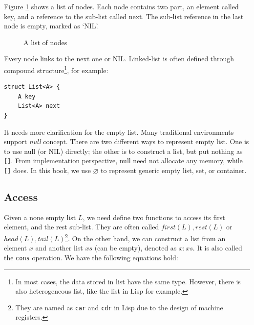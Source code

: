 \documentclass[b5paper]{article}
\begin{document}
Figure \ref{fig:list-example} shows a list of nodes. Each node contains two part, an element called key, and a reference to the sub-list called next. The sub-list reference in the last node is empty, marked as `NIL'.

\begin{figure}[htbp]
  \centering
  \caption{A list of nodes}
  \label{fig:list-example}
\end{figure}

Every node links to the next one or NIL. Linked-list is often defined through compound structure\footnote{In most cases, the data stored in list have the same type. However, there is also heterogeneous list, like the list in Lisp for example.}, for example:

\lstset{frame=single}
\begin{lstlisting}[language=Bourbaki]
struct List<A> {
    A key
    List<A> next
}
\end{lstlisting}

 
It needs more clarification for the empty list. Many traditional environments support {\em null} concept. There are two different ways to represent empty list. One is to use null (or NIL) directly; the other is to construct a list, but put nothing as \texttt{[]}. From implementation perspective, null need not allocate any memory, while \texttt{[]} does. In this book, we use $\varnothing$ to represent generic empty list, set, or container.

\subsection{Access}
 
 
Given a none empty list $L$, we need define two functions to access its first element, and the rest sub-list. They are often called $first(L), rest(L)$ or $head(L), tail(L)$\footnote{They are named as \texttt{car} and \texttt{cdr} in Lisp due to the design of machine registers\cite{SICP}.}. On the other hand, we can construct a list from an element $x$ and another list $xs$ (can be empty), denoted as $x : xs$. It is also called the \texttt{cons} operation. We have the following equations hold:
\end{document}

